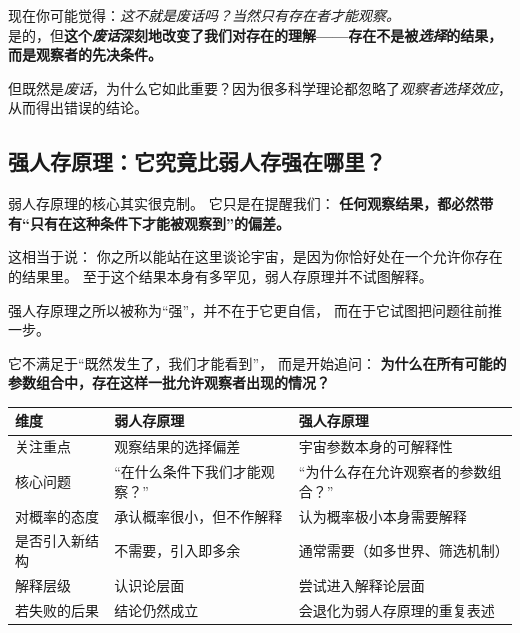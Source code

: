\documentclass[../main.tex]{subfiles}
\begin{document}
	\begin{tcolorbox}[colback=yellow!5, title=\textit{读者行为预测}]
		现在你可能觉得：\textit{这不就是废话吗？当然只有存在者才能观察。}\\
		是的，但\textbf{这个\textit{废话}深刻地改变了我们对\textbf{存在}的理解——存在不是被\textit{选择}的结果，而是观察者的先决条件。}
	\end{tcolorbox}

	但既然是\textit{废话}，为什么它如此重要？因为很多科学理论都忽略了\textit{观察者选择效应}，从而得出错误的结论。
	
	
\subsection{强人存原理：它究竟比弱人存强在哪里？}

弱人存原理的核心其实很克制。  
它只是在提醒我们：  
\textbf{任何观察结果，都必然带有“只有在这种条件下才能被观察到”的偏差。}

这相当于说：  
你之所以能站在这里谈论宇宙，是因为你恰好处在一个允许你存在的结果里。  
至于这个结果本身有多罕见，弱人存原理并不试图解释。

强人存原理之所以被称为“强”，并不在于它更自信，  
而在于它试图把问题往前推一步。

它不满足于“既然发生了，我们才能看到”，  
而是开始追问：  
\textbf{为什么在所有可能的参数组合中，存在这样一批允许观察者出现的情况？}

\begin{center}
	\begin{tabular}{|p{3cm}|p{5cm}|p{5cm}|}
		\hline
		\textbf{维度} & \textbf{弱人存原理} & \textbf{强人存原理} \\
		\hline
		关注重点 &
		观察结果的选择偏差 &
		宇宙参数本身的可解释性 \\
		\hline
		核心问题 &
		“在什么条件下我们才能观察？” &
		“为什么存在允许观察者的参数组合？” \\
		\hline
		对概率的态度 &
		承认概率很小，但不作解释 &
		认为概率极小本身需要解释 \\
		\hline
		是否引入新结构 &
		不需要，引入即多余 &
		通常需要（如多世界、筛选机制） \\
		\hline
		解释层级 &
		认识论层面 &
		尝试进入解释论层面 \\
		\hline
		若失败的后果 &
		结论仍然成立 &
		会退化为弱人存原理的重复表述 \\
		\hline
	\end{tabular}
\end{center}
\end{document}
